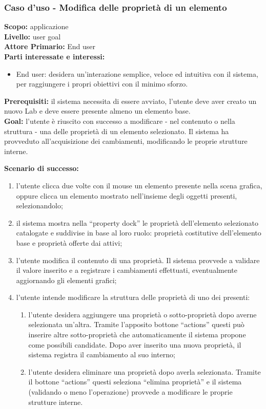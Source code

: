 \begin{flushleft}
\begin{boxedminipage}{\textwidth}

\subsubsection*{Caso d'uso - Modifica delle proprietà di un elemento}

\textbf{Scopo:} applicazione \visualnetkit{} \\
\textbf{Livello:} user goal \\
\textbf{Attore Primario:} End user \\
\textbf{Parti interessate e interessi:}
\begin{itemize}
\item End user: desidera un'interazione semplice, veloce ed intuitiva con il sistema, per raggiungere i propri obiettivi con il minimo sforzo.
\end{itemize}

\textbf{Prerequisiti:} il sistema necessita di essere avviato, l'utente deve aver creato un nuovo Lab e deve essere presente almeno un elemento base. \\
\textbf{Goal:} l'utente è riuscito con successo a modificare - nel contenuto o nella struttura - una delle proprietà di un elemento selezionato. Il sistema ha provveduto all'acquisizione dei cambiamenti, modificando le proprie strutture interne.

\textbf{Scenario di successo:}
\begin{enumerate}
\item l'utente clicca due volte con il mouse un elemento presente nella scena grafica, oppure clicca un elemento mostrato nell'insieme degli oggetti presenti, selezionandolo;
\item il sistema mostra nella ``property dock'' le proprietà dell'elemento selezionato catalogate e suddivise in base al loro ruolo: proprietà costitutive dell'elemento base e proprietà offerte dai \plugin{} attivi;
\item l'utente modifica il contenuto di una proprietà. Il sistema provvede a validare il valore inserito e a registrare i cambiamenti effettuati, eventualmente aggiornando gli elementi grafici;
\item l'utente intende modificare la struttura delle proprietà di uno dei \plugin{} presenti:
	\begin{enumerate}
	\item l'utente desidera aggiungere una proprietà o sotto-proprietà dopo averne selezionata un'altra. Tramite l'apposito bottone ``actions'' questi può inserire altre sotto-proprietà che automaticamente il sistema propone come possibili candidate. Dopo aver inserito una nuova proprietà, il sistema registra il cambiamento al suo interno;
	\item l'utente desidera eliminare una proprietà dopo averla selezionata. Tramite il bottone ``actions'' questi seleziona ``elimina proprietà'' e il sistema (validando o meno l'operazione) provvede a modificare le proprie strutture interne.
	\end{enumerate}
\end{enumerate}


\end{boxedminipage}
\end{flushleft}

